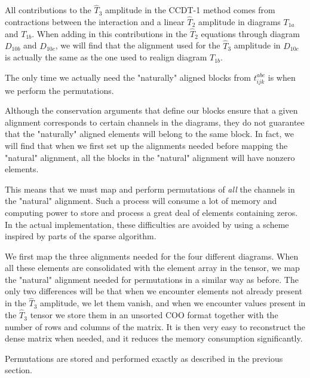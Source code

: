All contributions to the $\hat{T}_3$ amplitude in the CCDT-1 method comes
from contractions between the interaction and a linear $\hat{T}_2$ amplitude
in diagrams $T_{1a}$ and $T_{1b}$. When adding in this contributions
in the $\hat{T}_2$ equations through diagram $D_{10b}$ and $D_{10c}$, we will
find that the alignment used for the $\hat{T}_3$ amplitude in $D_{10c}$ is
actually the same as the one used to realign diagram $T_{1b}$.

The only time we actually need the "naturally" aligned blocks from
$t^{abc}_{ijk}$ is when we perform the permutations.

Although the conservation arguments that define our blocks ensure that
a given alignment corresponds to certain channels in the diagrams,
they do not guarantee that the "naturally" aligned elements will
belong to the same block. In fact, we will find that when we first set
up the alignments needed before mapping the "natural" alignment, all
the blocks in the "natural" alignment will have nonzero elements.

This means that we must map and perform permutations of \emph{all} the
channels in the "natural" alignment. Such a process will consume a lot
of memory and computing power to store and process a great deal of
elements containing zeros. In the actual implementation, these
difficulties are avoided by using a scheme inspired by parts of the
sparse algorithm.

We first map the three alignments needed for the four different
diagrams. When all these elements are consolidated with the element
array in the tensor, we map the "natural" alignment needed for
permutations in a similar way as before. The only two differences will
be that when we encounter elements not already present in the $\hat{T}_3$
amplitude, we let them vanish, and when we encounter values present in
the $\hat{T}_3$ tensor we store them in an unsorted COO format together with
the number of rows and columns of the matrix. It is then very easy to
reconstruct the dense matrix when needed, and it reduces the memory
consumption significantly.

Permutations are stored and performed exactly as described in the previous section.







